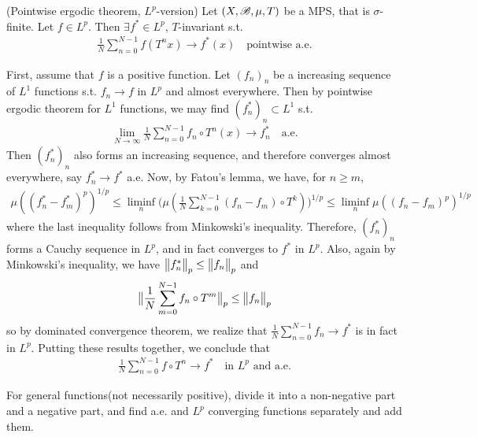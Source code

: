 \documentclass[10pt,a4paper]{report}
\newenvironment{proof}
{\begin{changemargin}{1cm}{0.5cm} 
	}%
	{\end{changemargin}
}
\begin{document}
\thm (Pointwise ergodic theorem, $L^p$-version) Let $(X,\mathscr{B}, \mu, T)$ be a MPS, that is $\sigma$-finite. Let $f\in L^p$. Then $\exists f^* \in L^p$, $T$-invariant s.t.
\begin{align*}
\frac{1}{N} \sum_{n=0}^{N-1} f(T^n x) \rightarrow f^* (x) \quad \text{pointwise a.e.}
\end{align*}
\begin{proof}
\pf First, assume that $f$ is a positive function. Let $(f_n)_n$ be a increasing sequence of $L^1$ functions s.t. $f_n \rightarrow f$ in $L^p$ and almost everywhere. Then by pointwise ergodic theorem for $L^1$ functions, we may find $(f^*_n)_n \subset L^1$ s.t.
\begin{align*}
\lim_{N\rightarrow \infty }\frac{1}{N} \sum_{n=0}^{N-1} f_n \circ T^n (x) \rightarrow f^*_n \quad \text{a.e.}
\end{align*}
Then $(f^*_n)_n$ also forms an increasing sequence, and therefore converges almost everywhere, say $f^*_n \rightarrow f^*$ a.e. Now, by Fatou's lemma, we have, for $n\geq m$,
\begin{align*}
\mu( (f^*_n - f^*_m)^{p} )^{1/p} \leq \liminf_{n} \Big( \mu( \frac{1}{N} \sum_{k=0}^{N-1} (f_n - f_m)  \circ T^k )  \Big)^{1/p} \leq \liminf_n \mu((f_n-f_m)^p)^{1/p}
\end{align*}
where the last inequality follows from Minkowski's inequality. Therefore, $(f^*_n)_n$ forms a Cauchy sequence in $L^p$, and in fact converges to $f^*$ in $L^p$. Also, again by Minkowski's inequality, we have $\bigl\lVert f^*_n\bigr\rVert_{p} \leq \bigl\lVert f_n\bigr\rVert_{p}$ and 
\begin{align*}
\bigl\lVert\frac{1}{N} \sum_{m=0}^{N-1} f_n \circ T^m\bigr\rVert_{p} \leq \bigl\lVert f_n\bigr\rVert_{p}
\end{align*}
so by dominated convergence theorem, we realize that $\frac{1}{N} \sum_{n=0}^{N-1} f_n \rightarrow f^*$ is in fact in $L^p$. Putting these results together, we conclude that
\begin{align*}
\frac{1}{N} \sum_{n=0}^{N-1} f \circ T^n \rightarrow f^* \quad \text{in } L^p \text{ and a.e.}
\end{align*}


\begin{center}
\begin{large}
\end{large}
\end{center}

\quad For general functions(not necessarily positive), divide it into a non-negative part and a negative part, and find a.e. and $L^p$ converging functions separately and add them.
\end{proof}
\end{document}
